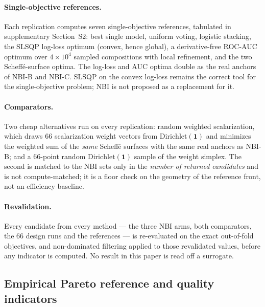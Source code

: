 \paragraph{Single-objective references.} Each replication computes seven single-objective references, tabulated in
supplementary Section~S2: best single model, uniform voting, logistic stacking, the SLSQP log-loss optimum (convex,
hence global), a derivative-free ROC-AUC optimum over $4\times10^{4}$ sampled compositions with local refinement, and
the two Scheff\'e-surface optima. The log-loss and AUC optima double as the real anchors of NBI-B
and NBI-C. SLSQP on the convex log-loss remains the correct tool for the single-objective problem; NBI is not
proposed as a replacement for it.

\paragraph{Comparators.} Two cheap alternatives run on every replication: random weighted scalarization, which
draws 66 scalarization weight vectors from $\mathrm{Dirichlet}(\mathbf{1})$ and minimizes the weighted sum of the
\emph{same} Scheff\'e surfaces with the same real anchors as NBI-B; and a 66-point random
$\mathrm{Dirichlet}(\mathbf{1})$ sample of the weight simplex. The second is matched to the NBI sets only in the
\emph{number of returned candidates} and is not compute-matched; it is a floor check on the geometry of the reference
front, not an efficiency baseline.

\paragraph{Revalidation.} Every candidate from every method --- the three NBI arms, both comparators, the 66 design
runs and the references --- is re-evaluated on the exact out-of-fold objectives, and non-dominated filtering applied
to those revalidated values, before any indicator is computed. No result in this paper is read off a surrogate.

\subsection{Empirical Pareto reference and quality indicators}
\label{sec:method:reference}

